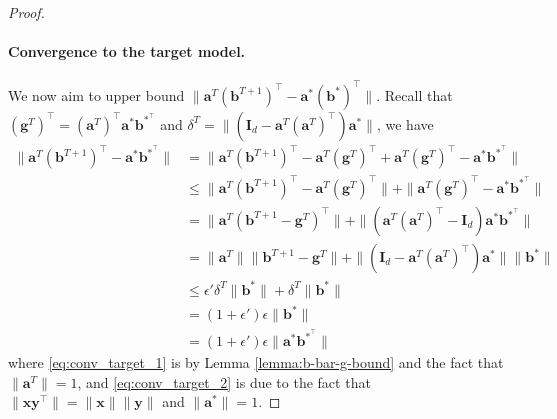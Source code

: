 \documentclass{article}
\theoremstyle{plain}
\theoremstyle{definition}
\theoremstyle{remark}
\begin{document}
\begin{proof}
    \paragraph{Convergence to the target model.} We now aim to upper bound $\| \mathbf{a}^T(\mathbf{b}^{T+1})^\top- \mathbf{a}^* ({\mathbf{b}}^*)^\top\|$. Recall that $(\mathbf g^T)^\top = (\mathbf a^T)^\top \mathbf a^* \mathbf b^{*^\top} $ and $\delta^T = \|  (\mathbf I_d - \mathbf{a}^T(\mathbf a^T)^\top )  \mathbf{a}^* \|$, we have
    \begin{align}
        \lVert \mathbf{a}^T(\mathbf{b}^{T+1})^\top- \mathbf{a}^* \mathbf b^{*^\top}\rVert &= \lVert \mathbf{a}^T(\mathbf{b}^{T+1})^\top - \mathbf{a}^T(\mathbf{g}^{T})^\top + \mathbf{a}^T(\mathbf{g}^{T})^\top- \mathbf{a}^* \mathbf b^{*^\top}\rVert \\
        &\le  \lVert \mathbf{a}^T(\mathbf{b}^{T+1})^\top - \mathbf{a}^T(\mathbf{g}^{T})^\top\| + \| \mathbf{a}^T(\mathbf{g}^{T})^\top- \mathbf{a}^* \mathbf b^{*^\top}\rVert \\
        &= \lVert \mathbf{a}^T(\mathbf{b}^{T+1}-\mathbf{g}^{T})^\top \| + \| (\mathbf{a}^T(\mathbf a^T)^\top  - \mathbf I_d) \mathbf{a}^* \mathbf b^{*^\top}\rVert \\
        &= \|\mathbf{a}^T\| \|\mathbf{b}^{T+1}-\mathbf{g}^{T} \| + \|  (\mathbf I_d - \mathbf{a}^T(\mathbf a^T)^\top )  \mathbf{a}^* \| \|{\mathbf{b}}^*\rVert \\
        &\le \epsilon' \delta^T \|\mathbf b^*\| + \delta^T\|\mathbf b^*\| \label{eq:conv_target_1}\\
        &= (1 + \epsilon') \epsilon \|\mathbf b^*\| \\
        &= (1 + \epsilon') \epsilon \|\mathbf a^* \mathbf b^{*^\top}\|\label{eq:conv_target_2}
    \end{align}
    where \eqref{eq:conv_target_1}  is by Lemma \ref{lemma:b-bar-g-bound} and the fact that $\|\mathbf a^T\| = 1$, and \eqref{eq:conv_target_2} is due to the fact that $\| \mathbf x \mathbf y^\top\| =\| \mathbf x \|\| \mathbf y\| $ and $\|\mathbf a^*\| = 1$.
\end{proof}
\end{document}
